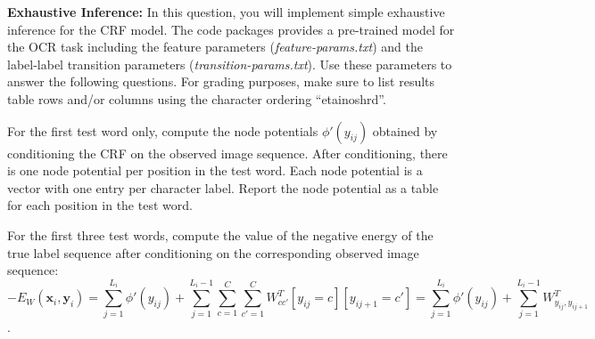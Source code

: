 \documentclass[11pt]{article}
\newcommand{\mbf}[1]{{\mathbf{#1}}}
\begin{document}
\begin{problem}{20} \textbf{Exhaustive Inference:} In this question, you will implement simple exhaustive inference for the CRF model. The code packages provides a pre-trained model for the OCR task including the feature parameters (\textit{feature-params.txt}) and the label-label transition parameters (\textit{transition-params.txt}). Use these parameters to answer the following questions. For grading purposes, make sure to list results table rows and/or columns using the character ordering ``etainoshrd''.

 {For the first test word only, compute the node potentials $\phi'(y_{ij})$ obtained by conditioning the CRF on the observed image sequence. After conditioning, there is one node potential per position in the test word. Each node potential is a vector with one entry per character label. Report the node potential as a table for each position in the test word.} 

 {For the first three test words, compute the value of the negative energy of the true label sequence after conditioning on the corresponding observed image sequence: 
$$-E_W(\mbf{x}_i,\mbf{y}_i)=\sum_{j=1}^{L_i} \phi'(y_{ij}) + \sum_{j=1}^{L_i-1}\sum_{c=1}^{C}\sum_{c'=1}^{C}W^T_{cc'}[y_{ij}=c][y_{ij+1}=c'] = \sum_{j=1}^{L_i} \phi'(y_{ij}) +\sum_{j=1}^{L_i-1}W^T_{y_{ij},y_{ij+1}}$$.}




\end{problem}
\end{document}
